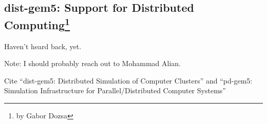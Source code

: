 \subsection[dist-gem5: Support for Distributed Computing]{dist-gem5: Support for Distributed Computing\footnote{by Gabor Dozsa}}

Haven't heard back, yet.

Note: I should probably reach out to Mohammad Alian.

Cite ``dist-gem5: Distributed Simulation of Computer Clusters'' and ``pd-gem5: Simulation Infrastructure for Parallel/Distributed Computer Systems''
